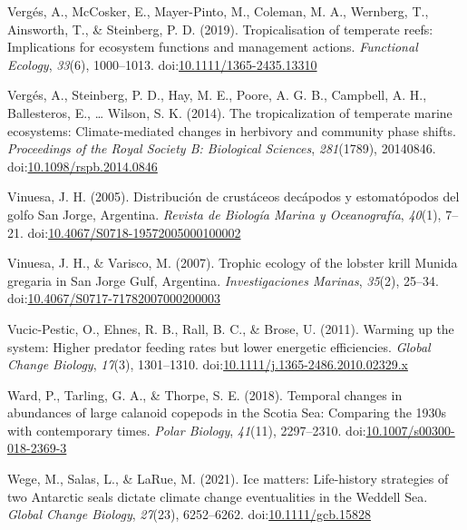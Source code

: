 \documentclass[
]{article}
\newlength{\cslhangindent}
\newenvironment{CSLReferences}[2] %
 {\begin{list}{}{%
  \setlength{\itemindent}{0pt}
  \setlength{\leftmargin}{0pt}
  \setlength{\parsep}{0pt}
  \ifodd #1
   \setlength{\leftmargin}{\cslhangindent}
   \setlength{\itemindent}{-1\cslhangindent}
  \fi
  \setlength{\itemsep}{#2\baselineskip}}}
 {\end{list}}
\begin{document}
\begin{CSLReferences}{1}{0}
Vergés, A., McCosker, E., Mayer-Pinto, M., Coleman, M. A., Wernberg, T.,
Ainsworth, T., \& Steinberg, P. D. (2019). Tropicalisation of temperate
reefs: {Implications} for ecosystem functions and management actions.
\emph{Functional Ecology}, \emph{33}(6), 1000--1013.
doi:\href{https://doi.org/10.1111/1365-2435.13310}{10.1111/1365-2435.13310}

Vergés, A., Steinberg, P. D., Hay, M. E., Poore, A. G. B., Campbell, A.
H., Ballesteros, E., \ldots{} Wilson, S. K. (2014). The tropicalization
of temperate marine ecosystems: Climate-mediated changes in herbivory
and community phase shifts. \emph{Proceedings of the Royal Society B:
Biological Sciences}, \emph{281}(1789), 20140846.
doi:\href{https://doi.org/10.1098/rspb.2014.0846}{10.1098/rspb.2014.0846}

Vinuesa, J. H. (2005). Distribución de crustáceos decápodos y
estomatópodos del golfo {San Jorge}, {Argentina}. \emph{Revista de
Biología Marina y Oceanografía}, \emph{40}(1), 7--21.
doi:\href{https://doi.org/10.4067/S0718-19572005000100002}{10.4067/S0718-19572005000100002}

Vinuesa, J. H., \& Varisco, M. (2007). Trophic ecology of the lobster
krill {Munida} gregaria in {San Jorge Gulf}, {Argentina}.
\emph{Investigaciones Marinas}, \emph{35}(2), 25--34.
doi:\href{https://doi.org/10.4067/S0717-71782007000200003}{10.4067/S0717-71782007000200003}

Vucic-Pestic, O., Ehnes, R. B., Rall, B. C., \& Brose, U. (2011).
Warming up the system: Higher predator feeding rates but lower energetic
efficiencies. \emph{Global Change Biology}, \emph{17}(3), 1301--1310.
doi:\href{https://doi.org/10.1111/j.1365-2486.2010.02329.x}{10.1111/j.1365-2486.2010.02329.x}

Ward, P., Tarling, G. A., \& Thorpe, S. E. (2018). Temporal changes in
abundances of large calanoid copepods in the {Scotia Sea}: Comparing the
1930s with contemporary times. \emph{Polar Biology}, \emph{41}(11),
2297--2310.
doi:\href{https://doi.org/10.1007/s00300-018-2369-3}{10.1007/s00300-018-2369-3}

Wege, M., Salas, L., \& LaRue, M. (2021). Ice matters: {Life-history}
strategies of two {Antarctic} seals dictate climate change eventualities
in the {Weddell Sea}. \emph{Global Change Biology}, \emph{27}(23),
6252--6262.
doi:\href{https://doi.org/10.1111/gcb.15828}{10.1111/gcb.15828}


\end{CSLReferences}
\end{document}
